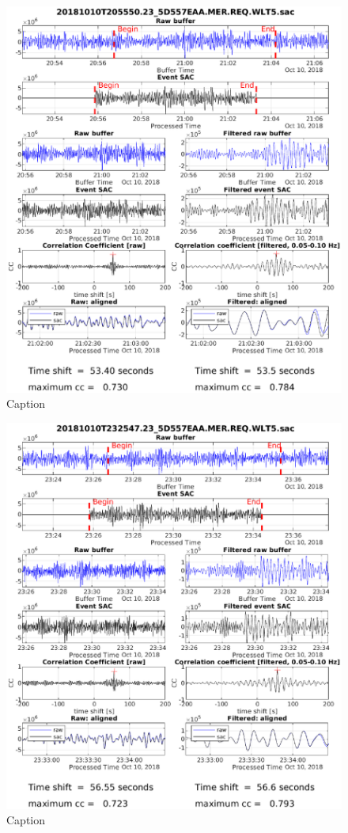 \documentclass[11pt,letterpaper]{article}
\begin{document}
\begin{figure}
    \centering
    \includegraphics[width=\linewidth]{Figures/Matched_SACs/20181010T205550.eps}
    \caption{Caption}
    \label{fig:matched_01}
\end{figure}

\begin{figure}
    \centering
    \includegraphics[width=\linewidth]{Figures/Matched_SACs/20181010T232547.eps}
    \caption{Caption}
    \label{fig:matched_02}
\end{figure}
\end{document}
